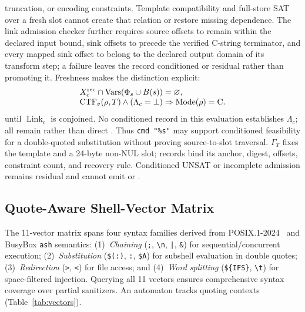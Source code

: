 truncation, or encoding constraints. Template compatibility and full-store SAT
over a fresh slot cannot create that relation or restore missing dependence.
The link admission checker further requires source offsets to remain within
the declared input bound, sink offsets to precede the verified C-string
terminator, and every mapped sink offset to belong to the declared output
domain of its transform step; a failure leaves the record conditioned or
residual rather than promoting it.
Freshness makes the distinction explicit:
\begin{equation}
\begin{aligned}
X_c^{\rm rec}\cap\operatorname{Vars}(\Phi_s\cup B(s))
  &=\varnothing,\\[-1mm]
\operatorname{CTF}_v(\rho,T)\land(\Lambda_c=\bot)
  &\Rightarrow\operatorname{Mode}(\rho)=\mathrm C.
\end{aligned}
\label{eq:conditioned-nonescalation}
\end{equation}
until $\operatorname{Link}_c$ is conjoined. No conditioned record in this
evaluation establishes $\Lambda_c$; all remain \ctsat rather than direct
\svsat. Thus \texttt{cmd "\%s"} may support conditioned feasibility for a
double-quoted substitution without proving source-to-slot traversal. $\Gamma_T$
fixes the template and a 24-byte non-NUL slot; records bind its anchor, digest,
offsets, constraint count, and recovery rule. Conditioned UNSAT or incomplete
admission remains residual and cannot emit \mfilt or \nms.

\subsection{Quote-Aware Shell-Vector Matrix}
\label{sec:matrix}

The 11-vector matrix spans four syntax families derived from POSIX.1-2024~\cite{posix2024,smoosh2020} and BusyBox \texttt{ash} semantics: (1)~\emph{Chaining} (\texttt{;}, \texttt{\textbackslash n}, \texttt{|}, \texttt{\&}) for sequential/concurrent execution; (2)~\emph{Substitution} (\texttt{\$(\!:\!)}, \texttt{\textasciigrave:\textasciigrave}, \texttt{\$A}) for subshell evaluation in double quotes; (3)~\emph{Redirection} (\texttt{>}, \texttt{<}) for file access; and (4)~\emph{Word splitting} (\texttt{\$\{IFS\}}, \texttt{\textbackslash t}) for space-filtered injection. Querying all 11 vectors ensures comprehensive syntax coverage over partial sanitizers. An automaton tracks quoting contexts (Table~\ref{tab:vectors}).

